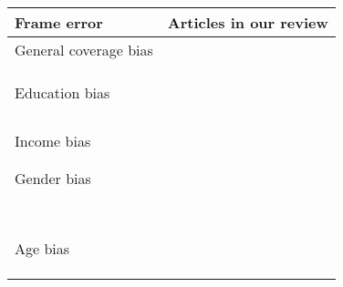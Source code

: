 \begin{table}
    \centering
	\begin{tabular}{ll}
		\toprule
		Frame error & Articles in our review\\
		\midrule
        General coverage bias & \cite{keusch_coverage_2020, revilla_online_2016}\\
        & \cite{gummer_does_2019, bucher_exploring_2021}\\
        & \cite{de_bruijne_mobile_2014, fuchs_coverage_2009}\\
        & \cite{wells_what_2015}\\
        Education bias & \cite{de_bruijne_comparing_2013, keusch_coverage_2020}\\
        & \cite{gummer_does_2019, de_bruijne_mobile_2014}\\
        & \cite{zou_mobile_2021, skeie_smartphone_2019}\\
        & \cite{keusch_using_2021, keusch_web_2017}\\
        & \cite{toepoel_what_2014, wenz_willingness_2019}\\
        Income bias & \cite{haan_can_2019, zou_mobile_2021}\\
        & \cite{ skeie_smartphone_2019, toepoel_what_2014}\\
        & \cite{wenz_willingness_2019}\\
        Gender bias & \cite{haan_can_2019, de_bruijne_comparing_2013}\\
        & \cite{wells_comparison_2014, keusch_coverage_2020}\\
        & \cite{liebe_does_2015, lambert_living_2015}\\
        & \cite{bosch_measurement_2019}\\
    	& \cite{schlosser_mobile_2018}\\
        & \cite{de_bruijne_mobile_2014, zou_mobile_2021}\\
        & \cite{brosnan_pc_2017, skeie_smartphone_2019}\\
        & \cite{keusch_web_2017, toepoel_what_2014}\\
        & \cite{wenz_willingness_2019}\\
        Age bias & \cite{haan_can_2019, de_bruijne_comparing_2013}\\
        & \cite{wells_comparison_2014, keusch_coverage_2020}\\
        & \cite{revilla_online_2016, gummer_does_2019}\\
        & \cite{liebe_does_2015}\\

\end{tabular}
\end{table}
